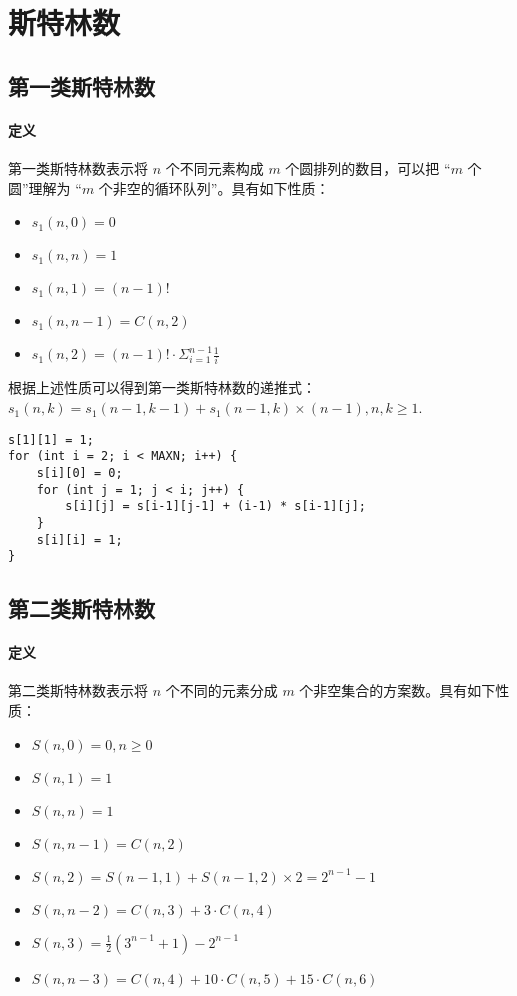 \section{斯特林数}
\subsection{第一类斯特林数}
\paragraph{定义} 第一类斯特林数表示将 $n$ 个不同元素构成 $m$ 个圆排列的数目，可以把 “$m$ 个圆”理解为 “$m$ 个非空的循环队列”。具有如下性质：
\begin{itemize}
    \item $s_1(n,0) = 0$
    \item $s_1(n,n) = 1$
    \item $s_1(n, 1) = (n-1)!$
    \item $s_1(n, n-1) = C(n, 2)$
    \item $s_1(n, 2) = (n-1)! \cdot \Sigma_{i=1}^{n-1}\frac{1}{i}$
\end{itemize}
\par 根据上述性质可以得到第一类斯特林数的递推式：$s_1(n, k) = s_1(n-1, k-1) + s_1(n-1, k) \times (n-1), n,k \geq 1$.
\begin{verbatim}
s[1][1] = 1;
for (int i = 2; i < MAXN; i++) {
    s[i][0] = 0;
    for (int j = 1; j < i; j++) {
        s[i][j] = s[i-1][j-1] + (i-1) * s[i-1][j];
    }
    s[i][i] = 1;
}
\end{verbatim}

\subsection{第二类斯特林数}
\paragraph{定义} 第二类斯特林数表示将 $n$ 个不同的元素分成 $m$ 个非空集合的方案数。具有如下性质：

\begin{itemize}
    \item $S(n,0) = 0, n \geq 0$
    \item $S(n,1) = 1$
    \item $S(n,n) = 1$
    \item $S(n, n-1) = C(n, 2)$
    \item $S(n, 2) = S(n-1, 1) +S(n-1, 2) \times 2 = 2^{n-1}-1$
    \item $S(n, n-2) = C(n, 3) + 3 \cdot C(n, 4)$ 
    \item $S(n, 3) = \frac{1}{2}(3^{n-1}+1)-2^{n-1}$
    \item $S(n, n-3) = C(n,4) + 10 \cdot C(n, 5) +15 \cdot C(n, 6)$
\end{itemize}

